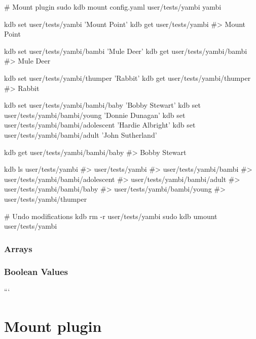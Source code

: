 \begin{DoxyCode}
# Mount plugin
sudo kdb mount config.yaml user/tests/yambi yambi

kdb set user/tests/yambi 'Mount Point'
kdb get user/tests/yambi
#> Mount Point

kdb set user/tests/yambi/bambi 'Mule Deer'
kdb get user/tests/yambi/bambi
#> Mule Deer

kdb set user/tests/yambi/thumper 'Rabbit'
kdb get user/tests/yambi/thumper
#> Rabbit

kdb set user/tests/yambi/bambi/baby 'Bobby Stewart'
kdb set user/tests/yambi/bambi/young 'Donnie Dunagan'
kdb set user/tests/yambi/bambi/adolescent 'Hardie Albright'
kdb set user/tests/yambi/bambi/adult 'John Sutherland'

kdb get user/tests/yambi/bambi/baby
#> Bobby Stewart

kdb ls user/tests/yambi
#> user/tests/yambi
#> user/tests/yambi/bambi
#> user/tests/yambi/bambi/adolescent
#> user/tests/yambi/bambi/adult
#> user/tests/yambi/bambi/baby
#> user/tests/yambi/bambi/young
#> user/tests/yambi/thumper

# Undo modifications
kdb rm -r user/tests/yambi
sudo kdb umount user/tests/yambi
\end{DoxyCode}


\subsubsection*{Arrays}




\subsubsection*{Boolean Values}

``` \section*{Mount plugin}

